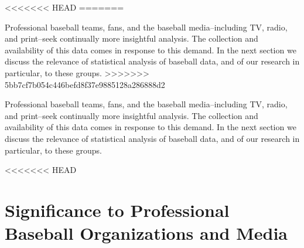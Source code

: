 <<<<<<< HEAD
=======

Professional baseball teams, fans, and the baseball media--including TV, radio, and print--seek continually more insightful analysis. The collection and availability of this data comes in response to this demand. In the next section we discuss the relevance of statistical analysis of baseball data, and of our research in particular, to these groups.
>>>>>>> 5bb7cf7b054c446befd8f37e9885128a286888d2

Professional baseball teams, fans, and the baseball media--including TV, radio, and print--seek continually more insightful analysis. The collection and availability of this data comes in response to this demand. In the next section we discuss the relevance of statistical analysis of baseball data, and of our research in particular, to these groups.

<<<<<<< HEAD
\section{Significance to Professional Baseball Organizations and Media}

